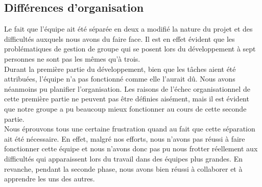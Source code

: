 \documentclass[a4paper,12pt]{article}
\begin{document}
\subsection{Différences d'organisation}
Le fait que l'équipe ait été séparée en deux a modifié la nature du projet et
des difficultés auxquels nous avons du faire face. Il est en effet évident que
les problématiques de gestion de groupe qui se posent lors du développement à
sept personnes ne sont pas les mêmes qu'à trois.
\\
Durant la première partie du développement, bien que les tâches aient été
attribuées, l'équipe n'a pas fonctionné comme elle l'aurait dû. Nous avons
néanmoins pu planifier l'organisation. Les raisons de l'échec organisationnel de
cette première partie ne peuvent pas être définies aisément, mais il est
évident que notre groupe a pu beaucoup mieux fonctionner au cours de cette
seconde partie.
\\
Nous éprouvons tous une certaine frustration quand au fait que cette séparation
ait été nécessaire. En effet, malgré nos efforts, nous n'avons pas réussi à
faire fonctionner cette équipe et nous n'avons donc pas pu nous frotter
réellement aux difficultés qui apparaissent lors du travail dans des équipes
plus grandes. En revanche, pendant la seconde phase, nous avons bien réussi à
collaborer et à apprendre les uns des autres.
\end{document}
